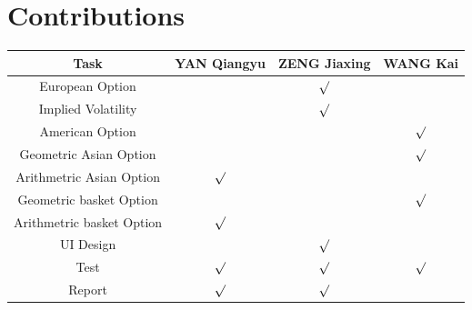 \documentclass[11pt,a4paper]{article}
\begin{document}
    \section{Contributions}
    \begin{table}[h]
    \centering
    \begin{tabular}{|c|c|c|c|}
        \hline
        Task & YAN Qiangyu & ZENG Jiaxing & WANG Kai \\
        \hline
        European Option & & $\surd$ & \\
        \hline
        Implied Volatility && $\surd$ & \\
        \hline
        American Option &&& $\surd$ \\
        \hline
        Geometric Asian Option &&& $\surd$ \\
        \hline
        Arithmetric Asian Option & $\surd$ && \\
        \hline
        Geometric basket Option &&& $\surd$ \\
        \hline
        Arithmetric basket Option & $\surd$ && \\
        \hline
        UI Design && $\surd$ & \\
        \hline
        Test & $\surd$ & $\surd$ & $\surd$ \\
        \hline
        Report & $\surd$ & $\surd$ &  \\
        \hline
    \end{tabular}
    \end{table}

    
\end{document}
